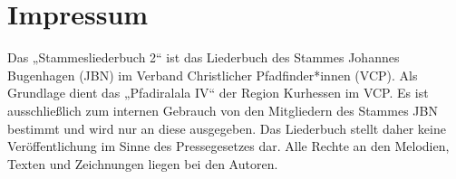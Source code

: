 \section*{Impressum}

\vspace{10pt} Das „Stammesliederbuch 2“ ist das Liederbuch des Stammes Johannes Bugenhagen (JBN) im Verband Christlicher Pfadfinder*innen (VCP). Als Grundlage dient das „Pfadiralala IV“ der Region Kurhessen im VCP. Es ist ausschließlich zum internen Gebrauch von den Mitgliedern des Stammes JBN bestimmt und wird nur an diese ausgegeben. Das Liederbuch stellt daher keine Veröffentlichung im Sinne des Pressegesetzes dar. Alle Rechte an den Melodien, Texten und Zeichnungen liegen bei den Autoren. \\ \vspace{10pt}

